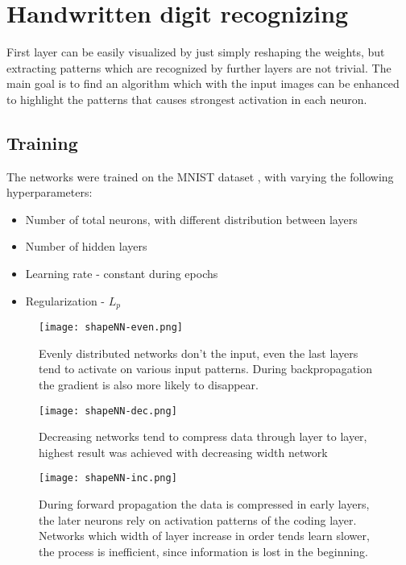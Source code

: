 
\section{Handwritten digit recognizing}
First layer can be easily visualized by just simply reshaping the weights, but extracting patterns which are recognized by further layers are not trivial. The main goal is to find an algorithm which with the input images can be enhanced to highlight the patterns that causes strongest activation in each neuron.


\subsection{Training}
\label{train}
The networks were trained on the MNIST dataset \cite{mnist}, with varying the following hyperparameters:
\begin{itemize}
    \item Number of total neurons, with different distribution between layers
    \item Number of hidden layers
    \item Learning rate - constant during epochs
    \item Regularization - $L_p$
\end{itemize}

\begin{figure}
    \centering
    \texttt{[image: shapeNN-even.png]}
    \caption{Evenly distributed networks don't the input, even the last layers tend to activate on various input patterns. During backpropagation the gradient is also more likely to disappear.}
    \label{fig:even}
\end{figure}
\begin{figure}
    \centering
    \texttt{[image: shapeNN-dec.png]}
    \caption{Decreasing networks tend to compress data through layer to layer, highest result was achieved with decreasing width network}
    \label{fig:dec}
\end{figure}
\begin{figure}
    \centering
    \texttt{[image: shapeNN-inc.png]}
    \caption{During forward propagation the data is compressed in early layers, the later neurons rely on activation patterns of the coding layer. Networks which width of layer increase in order tends learn slower, the process is inefficient, since information is lost in the beginning.}
    \label{fig:inc}
\end{figure}


